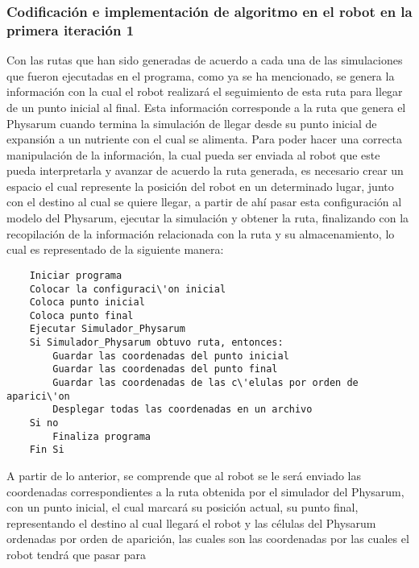 \subsubsection{Codificaci\'on e implementaci\'on de algoritmo en el robot en la primera iteraci\'on 1} %
\label{ssub:Codi}
    Con las rutas que han sido generadas de acuerdo a cada una
        de las simulaciones que fueron ejecutadas en el programa,
        como ya se ha mencionado, se genera la informaci\'on con la
        cual el robot realizar\'a el seguimiento de esta ruta para llegar
        de un punto inicial al final. Esta informaci\'on corresponde a
        la ruta que genera el Physarum cuando termina la simulaci\'on
        de llegar desde su punto inicial de expansi\'on a un nutriente
        con el cual se alimenta.
    \vskip 0.5cm
    Para poder hacer una correcta manipulaci\'on de la
        informaci\'on, la cual pueda ser enviada al robot que este
        pueda interpretarla y avanzar de acuerdo la ruta generada, es
        necesario crear un espacio el cual represente la posici\'on del
        robot en un determinado lugar, junto con el destino al cual se
        quiere llegar, a partir de ah\'i pasar esta configuraci\'on al
        modelo del Physarum, ejecutar la simulaci\'on y obtener la
        ruta, finalizando con la recopilaci\'on de la informaci\'on
        relacionada con la ruta y su almacenamiento, lo cual es
        representado de la siguiente manera:
    \vskip 0.5cm
    \begin{lstlisting}
    Iniciar programa
    Colocar la configuraci\'on inicial
    Coloca punto inicial
    Coloca punto final
    Ejecutar Simulador_Physarum
    Si Simulador_Physarum obtuvo ruta, entonces:
        Guardar las coordenadas del punto inicial
        Guardar las coordenadas del punto final
        Guardar las coordenadas de las c\'elulas por orden de aparici\'on
        Desplegar todas las coordenadas en un archivo
    Si no
        Finaliza programa
    Fin Si
    \end{lstlisting}
    \vskip 0.5cm
    A partir de lo anterior, se comprende que al robot se le ser\'a
        enviado las coordenadas correspondientes a la ruta obtenida
        por el simulador del Physarum, con un punto inicial, el cual
        marcar\'a su posici\'on actual, su punto final, representando el
        destino al cual llegar\'a el robot y las c\'elulas del Physarum
        ordenadas por orden de aparici\'on, las cuales son las
        coordenadas por las cuales el robot tendr\'a que pasar para
